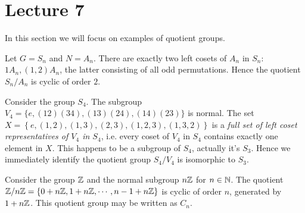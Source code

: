 \section{Lecture 7}
In this section we will focus on examples of quotient groups.

\begin{example}
  Let $G=S_n$ and $N=A_n$. There are exactly two left cosets of $A_n$ in $S_n$: $1A_n,
  (1,2)A_n$, the latter consisting of all odd permutations. Hence the quotient $S_n/A_n$
  is cyclic of order $2$.
\end{example}

\begin{example}
  Consider the group $S_4$. The subgroup $V_4 = \{e, (12)(34), (13)(24), (14)(23) \}$ is normal. The set $X=\left\{ e,(1,2),(1,3),(2,3),(1,2,3),(1,3,2) \right\}$ is a \emph{full set of left coset representatives of $V_4$ in $S_4$}, i.e. every coset of $V_4$ in $S_4$ contains exactly one element in $X$. This happens to be a subgroup of $S_4$, actually it's $S_3$. Hence we immediately identify the quotient group $S_4/V_4$ is isomorphic to $S_3$.
\end{example}

\begin{example}
  Consider the group $\mathbb Z$ and the normal subgroup $n\mathbb Z$ for $n\in\mathbb N$. The quotient
  $\mathbb Z/n\mathbb Z=\left\{ 0+n\mathbb Z, 1+n\mathbb Z, \cdots, n-1+n\mathbb Z \right\}$ is cyclic of order $n$,
  generated by $1+n\mathbb Z$. This quotient group may be written as $C_n$.
\end{example}


